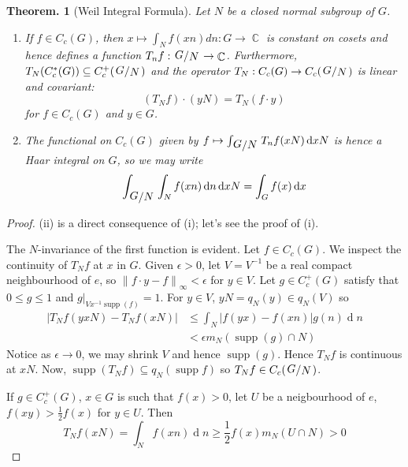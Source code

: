 \documentclass[11pt, a4paper]{memoir}
\DeclareMathOperator{\C}{{\mathbb{C}}}
\newcommand{\norm}[1]{\ensuremath{\left\lVert#1\right\rVert}}
\theoremstyle{change}
\newtheorem{theorem}{Theorem.}[section]
\theoremstyle{plain}
\theoremstyle{nonumberplain}
\newtheorem{proof}{Proof}
\newcommand{\quot}[2]{\mathchoice{\left.\raisebox{0.14em}{$#1$}\middle/\raisebox{-0.14em}{$#2$}\right.}
                                 {\left.\raisebox{0.08em}{$#1$}\middle/\raisebox{-0.08em}{$#2$}\right.}
                                 {\left.\raisebox{0.03em}{$#1$}\middle/\raisebox{-0.03em}{$#2$}\right.}
                                 {\left.\raisebox{0em}{$#1$}\middle/\raisebox{0em}{$#2$}\right.}}
\DeclareMathOperator{\supp}{supp}
\renewcommand{\d}[1]{\ensuremath{\operatorname{d}\!{#1}}}
\numberwithin{equation}{section}
\begin{document}
\begin{theorem}[Weil Integral Formula]
    Let $N$ be a closed normal subgroup of $G$.
    \begin{enumerate}[nl,r]
        \item If $f\in C_c(G)$, then $x\mapsto\int_Nf(xn)dn:G\to\C$ is constant on cosets and hence defines a function $T_nf:\quot{G}{N}\to\C$.
            Furthermore, $T_N(C_c^*(G))\subseteq C_c^+(\quot{G}{N})$ and the operator $T_N:C_c(G)\to C_c(\quot{G}{N})$ is linear and covariant:
            \begin{equation*}
                (T_Nf)\cdot(yN)=T_N(f\cdot y)
            \end{equation*}
            for $f\in C_c(G)$ and $y\in G$.
        \item The functional on $C_c(G)$ given by $f\mapsto\int_{\quot{G}{N}}T_nf(xN)\d{x}N$ is hence a Haar integral on $G$, so we may write
            \begin{equation*}
                \int_{\quot{G}{N}}\int_Nf(xn)\d{n}\d{xN}=\int_G f(x)\d{x}
            \end{equation*}
    \end{enumerate}
\end{theorem}
\begin{proof}
    (ii) is a direct consequence of (i); let's see the proof of (i).

    The $N$-invariance of the first function is evident.
    Let $f\in C_c(G)$.
    We inspect the continuity of $T_Nf$ at $x$ in $G$.
    Given $\epsilon>0$, let $V=V^{-1}$ be a real compact neighbourhood of $e$, so $\norm{f\cdot y-f}_\infty<\epsilon$ for $y\in V$.
    Let $g\in C_c^+(G)$ satisfy that $0\leq g\leq 1$ and $g|_{Vx^{-1}\supp(f)}=1$.
    For $y\in V$, $yN=q_N(y)\in q_N(V)$ so
    \begin{align*}
        |T_Nf(yxN)-T_Nf(xN)| &\leq\int_N|f(yx)-f(xn)|g(n)\d{n}\\
                             &<\epsilon m_N(\supp(g)\cap N)
    \end{align*}
    Notice as $\epsilon\to 0$, we may shrink $V$ and hence $\supp(g)$.
    Hence $T_Nf$ is continuous at $xN$.
    Now, $\supp(T_Nf)\subseteq q_N(\supp f)$ so $T_Nf\in C_c(\quot{G}{N})$.

    If $g\in C_c^+(G)$, $x\in G$ is such that $f(x)>0$, let $U$ be a neigbourhood of $e$, $f(xy)>\frac{1}{2}f(x)$ for $y\in U$.
    Then
    \begin{equation*}
        T_Nf(xN)=\int_N f(xn)\d{n}\geq\frac{1}{2}f(x)m_N(U\cap N)>0
    \end{equation*}
\end{proof}
\end{document}
